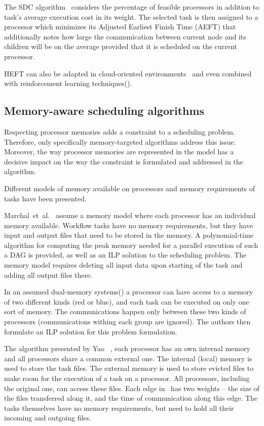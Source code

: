 \documentclass[conference]{IEEEtran}
\begin{document}
    The SDC algorithm~\cite{SHI2006665} considers the percentage of feasible processors in addition to task’s
    average execution cost in its weight.
    The selected task is then assigned to a processor which minimizes its Adjusted Earliest Finish Time (AEFT) that
    additionally notes how large the communication between current node and its children will be on the
    average provided that it is scheduled on the current processor.


    HEFT  can also be adapted in cloud-oriented environments~\cite{samadi2018eheft} and even combined with reinforcement
    learning techniques(\cite{yano2022cqga}).

    \subsection{Memory-aware scheduling algorithms}
    Respecting processor memories adds a constraint to a scheduling problem.
    Therefore, only specifically memory-targeted algorithms address this issue.
    Moreover, the way processor memories are represented in the model has a decisive impact on the way the constraint
    is formulated and addressed in the algorithm.

    Different models of memory available on processors and memory requirements of tasks have been presented.

    Marchal~et~al.~\cite{marchal2018parallel} assume a memory model where each processor has an individual memory available.
    Workflow tasks have no memory requirements, but they have input and output files that need to be stored in the memory.
    A polynomial-time algorithm for computing the peak memory needed for a parallel execution of such a DAG is provided,
    as well as an ILP solution to the scheduling problem.
    The memory model requires deleting all input data upon starting of the task and adding all output files there.

    In an assumed dual-memory systems(\cite{herrmann2014memory}) a processor can have access to a memory of two different
    kinds (red or blue), and each task can be executed on only one sort of memory.
    The communications happen only between these two kinds of processors (communications withing each group are ignored).
    The authors then formulate an ILP solution for this problem formulation.

    The algorithm presented by Yao \etal~\cite{yao2022memory}, each processor has an own internal memory and all
    processors share a common external one. The internal (local) memory is used to store the task files.
    The external memory is used to store evicted files to make room for the execution of a task on a processor.
    All processors, including the original one, can access these files.
    Each edge in~\cite{yao2022memory} has two weights -- the size of the files transferred along it,
    and the time of communication along this edge.
    The tasks themselves have no memory requirements, but need to hold all their incoming and outgoing files.
\end{document}

